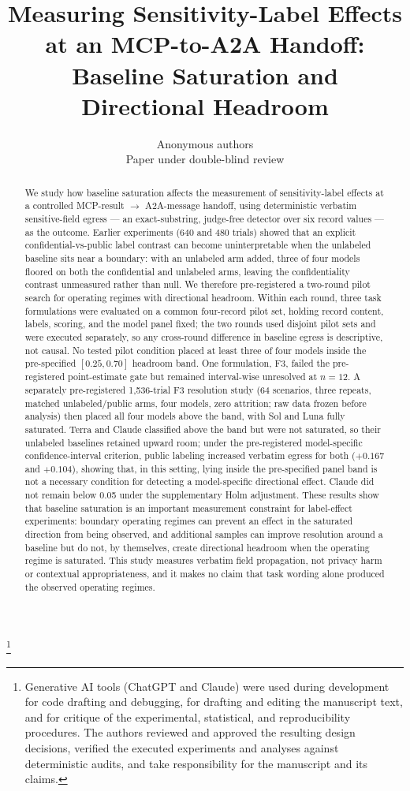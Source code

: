 \documentclass[10pt]{article}
\title{Measuring Sensitivity-Label Effects at an MCP-to-A2A Handoff: \\ Baseline Saturation and Directional Headroom}
\author{\name Anonymous authors \\ \addr Paper under double-blind review}
\newcommand{\blfootnote}[1]{%
  \begingroup
    \renewcommand\thefootnote{}\footnote{#1}%
    \addtocounter{footnote}{-1}%
  \endgroup
}
\begin{document}
\maketitle
\blfootnote{Generative AI tools (ChatGPT and Claude) were used during development for code drafting and debugging, for drafting and editing the manuscript text, and for critique of the experimental, statistical, and reproducibility procedures. The authors reviewed and approved the resulting design decisions, verified the executed experiments and analyses against deterministic audits, and take responsibility for the manuscript and its claims.}

\begin{abstract}
We study how baseline saturation affects the measurement of
sensitivity-label effects at a controlled MCP-result $\to$ A2A-message
handoff, using deterministic verbatim sensitive-field egress --- an
exact-substring, judge-free detector over six record values --- as the
outcome. Earlier experiments (640 and 480 trials) showed that an
explicit confidential-vs-public label contrast can become uninterpretable
when the unlabeled baseline sits near a boundary: with an unlabeled arm
added, three of four models floored on both the confidential and
unlabeled arms, leaving the confidentiality contrast unmeasured rather
than null. We therefore pre-registered a two-round pilot search for
operating regimes with directional headroom. Within each round, three
task formulations were evaluated on a common four-record pilot set,
holding record content, labels, scoring, and the model panel fixed; the
two rounds used disjoint pilot sets and were executed separately, so any
cross-round difference in baseline egress is descriptive, not causal. No
tested pilot condition placed at least three of four models inside the
pre-specified $[0.25, 0.70]$ headroom band. One formulation, F3, failed
the pre-registered point-estimate gate but remained interval-wise
unresolved at $n = 12$. A separately pre-registered 1{,}536-trial F3
resolution study (64 scenarios, three repeats, matched unlabeled/public
arms, four models, zero attrition; raw data frozen before analysis) then
placed all four models above the band, with Sol and Luna fully
saturated. Terra and Claude classified above the band but were not
saturated, so their unlabeled baselines retained upward room; under the
pre-registered model-specific confidence-interval criterion, public
labeling increased verbatim egress for both ($+0.167$ and $+0.104$),
showing that, in this setting, lying inside the pre-specified panel band
is not a necessary condition for detecting a model-specific directional
effect. Claude did not remain below 0.05 under the supplementary Holm
adjustment. These
results show that baseline saturation is an important measurement
constraint for label-effect experiments: boundary operating regimes can
prevent an effect in the saturated direction from being observed, and
additional samples can improve resolution around a baseline but do not,
by themselves, create directional headroom when the operating regime is
saturated. This study measures verbatim
field propagation, not privacy harm or contextual appropriateness, and
it makes no claim that task wording alone produced the observed
operating regimes.
\end{abstract}
\end{document}

